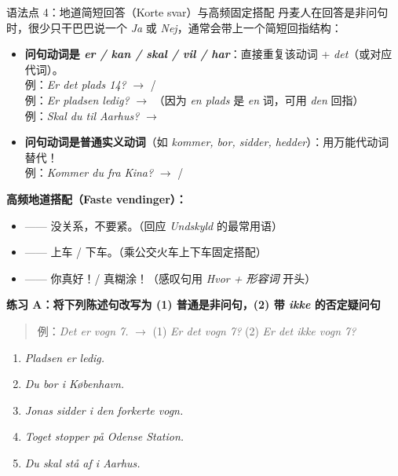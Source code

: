 \begin{grammatikbox}{语法点 4：地道简短回答（Korte svar）与高频固定搭配}
丹麦人在回答是非问句时，很少只干巴巴说一个 \textit{Ja} 或 \textit{Nej}，通常会带上一个简短回指结构：
\begin{itemize}
  \item \textbf{问句动词是 \textit{er / kan / skal / vil / har}}：直接重复该动词 + \textit{det}（或对应代词）。\\
    例：\textit{Er det plads 14?} $\rightarrow$  / \\
    例：\textit{Er pladsen ledig?} $\rightarrow$ （因为 \textit{en plads} 是 \textit{en} 词，可用 \textit{den} 回指）\\
    例：\textit{Skal du til Aarhus?} $\rightarrow$ 
  \item \textbf{问句动词是普通实义动词}（如 \textit{kommer, bor, sidder, hedder}）：用万能代动词  替代！\\
    例：\textit{Kommer du fra Kina?} $\rightarrow$  / 
\end{itemize}

\textbf{高频地道搭配（Faste vendinger）：}
\begin{itemize}
  \item {} —— 没关系，不要紧。（回应 \textit{Undskyld} 的最常用语）
  \item {} —— 上车 / 下车。（乘公交火车上下车固定搭配）
  \item {} —— 你真好！/ 真糊涂！（感叹句用 \textit{Hvor + 形容词} 开头）
\end{itemize}
\end{grammatikbox}


\textbf{练习 A：将下列陈述句改写为 (1) 普通是非问句，(2) 带 \textit{ikke} 的否定疑问句}
\begin{quote}
\small 例：\textit{Det er vogn 7.} $\rightarrow$ (1) \textit{Er det vogn 7?} \quad (2) \textit{Er det ikke vogn 7?}
\end{quote}
\begin{enumerate}
  \item \textit{Pladsen er ledig.}
  \item \textit{Du bor i København.}
  \item \textit{Jonas sidder i den forkerte vogn.}
  \item \textit{Toget stopper på Odense Station.}
  \item \textit{Du skal stå af i Aarhus.}
\end{enumerate}

